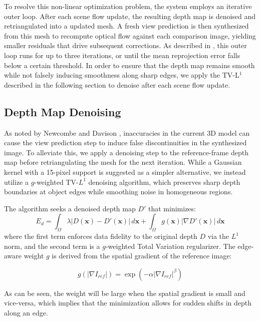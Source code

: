 \documentclass[10pt,twocolumn]{article}
\begin{document}
To resolve this non-linear optimization problem, the system employs an iterative outer loop. After each scene flow update, the resulting depth map is denoised and retriangulated into a updated mesh. A fresh view prediction is then synthesized from this mesh to recompute optical flow against each comparison image, yielding smaller residuals that drive subsequent corrections. As described in \cite{newcombe2010}, this outer loop runs for up to three iterations, or until the mean reprojection error falls below a certain threshold. In order to ensure that the depth map remains smooth while not falsely inducing smoothness along sharp edges, we apply the TV-L$^1$ described in the following section to denoise after each scene flow update.

\subsection{Depth Map Denoising}

As noted by Newcombe and Davison \cite{newcombe2010}, inaccuracies in the 
current 3D model can cause the view prediction step to induce false 
discontinuities in the synthesized image. To alleviate this, we apply a 
denoising step to the reference-frame depth map before retriangulating the 
mesh for the next iteration. While a Gaussian kernel with a 15-pixel support 
is suggested as a simpler alternative, we instead utilize a $g$-weighted 
TV-$L^1$ denoising algorithm, which preserves sharp depth boundaries at 
object edges while smoothing noise in homogeneous regions.

The algorithm seeks a denoised depth map $D'$ that minimizes:
\begin{equation}
E_d = \int_\Omega \lambda |D(\mathbf{x}) - D'(\mathbf{x})| \, d\mathbf{x} 
    + \int_\Omega g(\mathbf{x}) |\nabla D'(\mathbf{x})| \, d\mathbf{x}
\end{equation}
where the first term enforces data fidelity to the original depth $D$ via 
the $L^1$ norm, and the second term is a $g$-weighted Total Variation 
regularizer. The edge-aware weight $g$ is derived from the spatial gradient 
of the reference image:

\begin{equation}
g(|\nabla I_{ref}|)=\exp(-\alpha|\nabla I_{ref}|^\beta)
\end{equation}

As can be seen, the weight will be large when the spatial gradient is small and vice-versa, which implies that the minimization allows for sudden shifts in depth along an edge.
\end{document}
